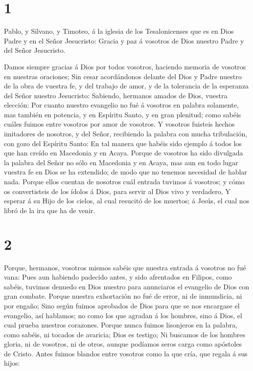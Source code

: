 \hypertarget{section}{%
\section{1}\label{section}}

 Pablo, y Silvano, y Timoteo, á la iglesia de los
Tesalonicenses que es en Dios Padre y en el Señor Jesucristo: Gracia y
paz á vosotros de Dios nuestro Padre y del Señor Jesucristo.

 Damos siempre gracias á Dios por todos vosotros, haciendo
memoria de vosotros en nuestras oraciones;  Sin cesar
acordándonos delante del Dios y Padre nuestro de la obra de vuestra fe,
y del trabajo de amor, y de la tolerancia de la esperanza del Señor
nuestro Jesucristo:  Sabiendo, hermanos amados de Dios,
vuestra elección:  Por cuanto nuestro evangelio no fué á
vosotros en palabra solamente, mas también en potencia, y en Espíritu
Santo, y en gran plenitud; como sabéis cuáles fuimos entre vosotros por
amor de vosotros.  Y vosotros fuisteis hechos imitadores de
nosotros, y del Señor, recibiendo la palabra con mucha tribulación, con
gozo del Espíritu Santo:  En tal manera que habéis sido
ejemplo á todos los que han creído en Macedonia y en Acaya. 
Porque de vosotros ha sido divulgada la palabra del Señor no sólo en
Macedonia y en Acaya, mas aun en todo lugar vuestra fe en Dios se ha
extendido; de modo que no tenemos necesidad de hablar nada. 
Porque ellos cuentan de nosotros cuál entrada tuvimos á vosotros; y cómo
os convertisteis de los ídolos á Dios, para servir al Dios vivo y
verdadero,  Y esperar á su Hijo de los cielos, al cual
resucitó de los muertos; á Jesús, el cual nos libró de la ira que ha de
venir.

\hypertarget{section-1}{%
\section{2}\label{section-1}}

 Porque, hermanos, vosotros mismos sabéis que nuestra
entrada á vosotros no fué vana:  Pues aun habiendo padecido
antes, y sido afrentados en Filipos, como sabéis, tuvimos denuedo en
Dios nuestro para anunciaros el evangelio de Dios con gran combate.
 Porque nuestra exhortación no fué de error, ni de
inmundicia, ni por engaño;  Sino según fuimos aprobados de
Dios para que se nos encargase el evangelio, así hablamos; no como los
que agradan á los hombres, sino á Dios, el cual prueba nuestros
corazones.  Porque nunca fuimos lisonjeros en la palabra,
como sabéis, ni tocados de avaricia; Dios es testigo;  Ni
buscamos de los hombres gloria, ni de vosotros, ni de otros, aunque
podíamos seros carga como apóstoles de Cristo.  Antes fuimos
blandos entre vosotros como la que cría, que regala á sus hijos:

